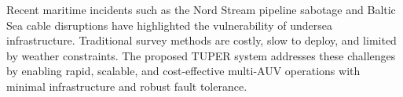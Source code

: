 

Recent maritime incidents such as the Nord Stream pipeline sabotage and Baltic Sea cable disruptions have highlighted the vulnerability of undersea infrastructure. Traditional survey methods are costly, slow to deploy, and limited by weather constraints. The proposed TUPER system addresses these challenges by enabling rapid, scalable, and cost-effective multi-AUV operations with minimal infrastructure and robust fault tolerance.
